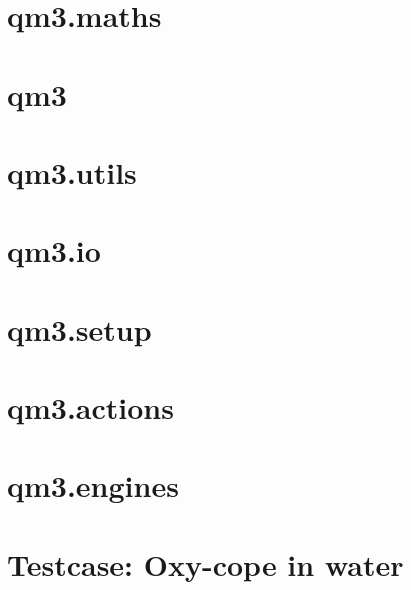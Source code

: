 \documentclass[10pt]{article}
\begin{document}
\lhead{} \chead{} \rhead{}
\lfoot{} \cfoot{} \rfoot{\thepage}
\renewcommand{\headrulewidth}{0pt}
\renewcommand{\footrulewidth}{0pt}

\setmainfont{Candara}

\tableofcontents

\newpage

\section{qm3.maths}








\section{qm3}





\section{qm3.utils}






\section{qm3.io}




\section{qm3.setup}


\section{qm3.actions}









\section{qm3.engines}


























\section{Testcase: Oxy-cope in water}



\end{document}
